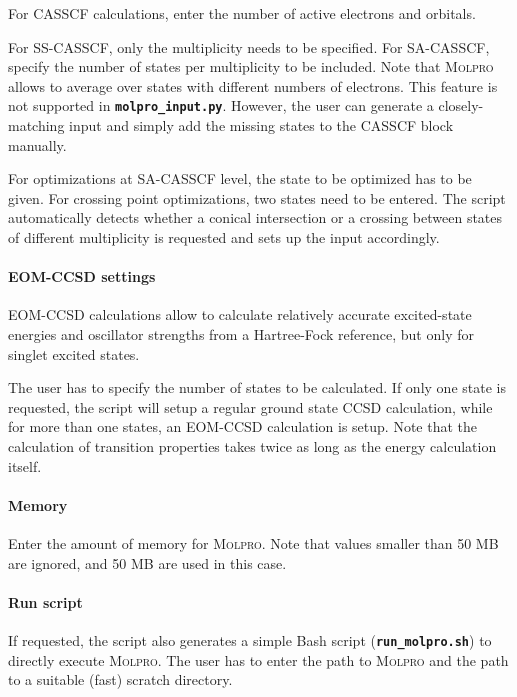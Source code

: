 \documentclass[a4paper,11pt,DIV=15,openany,twoside=false]{scrbook}
\newcommand{\ttt}[1]{\textbf{\texttt{#1}}}
\begin{document}
For CASSCF calculations, enter the number of active electrons and orbitals. 

For SS-CASSCF, only the multiplicity needs to be specified. For SA-CASSCF, specify the number of states per multiplicity to be included. Note that \textsc{Molpro} allows to average over states with different numbers of electrons. This feature is not supported in \ttt{molpro\_input.py}. However, the user can generate a closely-matching input and simply add the missing states to the CASSCF block manually. 

For optimizations at SA-CASSCF level, the state to be optimized has to be given. For crossing point optimizations, two states need to be entered. The script automatically detects whether a conical intersection or a crossing between states of different multiplicity is requested and sets up the input accordingly.

\paragraph{EOM-CCSD settings}

EOM-CCSD calculations allow to calculate relatively accurate excited-state energies and oscillator strengths from a Hartree-Fock reference, but only for singlet excited states.

The user has to specify the number of states to be calculated. If only one state is requested, the script will setup a regular ground state CCSD calculation, while for more than one states, an EOM-CCSD calculation is setup.
Note that the calculation of transition properties takes twice as long as the energy calculation itself.

\paragraph{Memory}

Enter the amount of memory for \textsc{Molpro}. Note that values smaller than 50 MB are ignored, and 50 MB are used in this case.

\paragraph{Run script}

If requested, the script also generates a simple Bash script (\ttt{run\_molpro.sh}) to directly execute \textsc{Molpro}. The user has to enter the path to \textsc{Molpro} and the path to a suitable (fast) scratch directory. 
\end{document}
